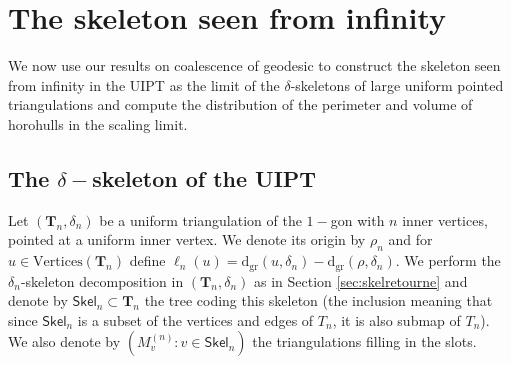 \documentclass[10pt]{amsart}
\theoremstyle{definition}\newtheorem{defi}[theo]{Definition}\newtheorem{rema}[theo]{Remark}\newtheorem{exam}[theo]{Example}\newtheorem{exem}[theo]{Example}\newtheorem{nota}[theo]{Notation}
\begin{document}
\section{The skeleton seen from infinity} \label{sec:skelinfinity}
We now use our results on coalescence of geodesic to construct the skeleton seen from infinity in the UIPT as the limit of the $\delta$-skeletons of  large uniform pointed triangulations and compute the distribution of the perimeter and volume of horohulls in the scaling limit.

\subsection{The \texorpdfstring{$\delta-$}{delta-}skeleton of the UIPT}

Let $( \mathbf{T}_{n}, \delta_{n})$ be a uniform triangulation of the $1-$gon with $n$ inner vertices, pointed at a uniform inner vertex. We denote its origin by $\rho_{n}$ and  for $u \in \mathrm{Vertices}( \mathbf{T}_{n})$ define $\ell_{n}(u) = \mathrm{d_{gr}}(u, \delta_{n})- \mathrm{d_{gr}}(\rho, \delta_{n})$. We perform the $\delta_n$-skeleton decomposition in $(\mathbf{T}_{n},\delta_n)$ as in Section \ref{sec:skelretourne} and denote by  $ \mathsf{Skel}_{n} \subset \mathbf{T}_{n}$ the tree coding this skeleton (the inclusion meaning that since $\mathsf{Skel}_n$ is a subset of the vertices and edges of $T_n$, it is also submap of $T_n$). We also denote by $(M^{(n)}_{v} : v \in \mathsf{Skel}_{n})$ the triangulations filling in the slots. %
\end{document}
